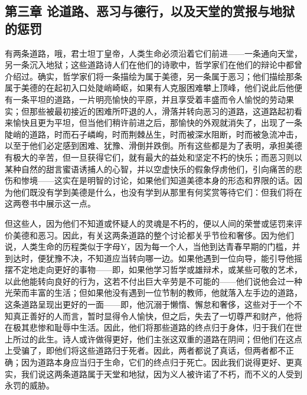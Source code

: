 
\subsection{第三章 论道路、恶习与德行，以及天堂的赏报与地狱的惩罚}

有两条道路，哦，君士坦丁皇帝，人类生命必须沿着它们前进——一条通向天堂，另一条沉入地狱；这些道路诗人们在他们的诗歌中，哲学家们在他们的辩论中都曾介绍过。确实，哲学家们将一条描绘为属于美德，另一条属于恶习；他们描绘那条属于美德的在起初入口处陡峭崎岖，如果有人克服困难攀上顶峰，他们说此后他便有一条平坦的道路，一片明亮愉快的平原，并且享受着丰盛而令人愉悦的劳动果实；但那些被最初接近的困难所吓退的人，滑落并转向恶习的道路，这道路起初看来愉快且更为平坦，但当他们稍许前进之后，那愉快的外观就消失了，出现了一条陡峭的道路，时而石子嶙峋，时而荆棘丛生，时而被深水阻断，时而被急流冲击，以至于他们必定感到困难、犹豫、滑倒并跌倒。所有这些都是为了表明，承担美德有极大的辛苦，但一旦获得它们，就有最大的益处和坚定不朽的快乐；而恶习则以某种自然的甜言蜜语诱捕人的心智，并以空虚快乐的假象俘虏他们，引向痛苦的悲伤和惨境——这实在是明智的讨论，如果他们知道美德本身的形态和界限的话。因为他们既没有学到美德是什么，也没有学到从那里有何奖赏等待它们：但我们将在这两卷书中展示这一点。\par

但这些人，因为他们不知道或怀疑人的灵魂是不朽的，便以人间的荣誉或惩罚来评价美德和恶习。因此，有关这两条道路的整个讨论都关乎节俭和奢侈。因为他们说，人类生命的历程类似于字母Y，因为每一个人，当他到达青春早期的门槛，并到达时，便犹豫不决，不知道应当转向哪一边。如果他遇到一位向导，能引导他摇摆不定地走向更好的事物——即，如果他学习哲学或雄辩术，或某些可敬的艺术，以此他能转向良好的行为，这若不付出巨大辛劳是不可能的——他们说他会过一种光荣而丰富的生活；但如果他没有遇到一位节制的教师，他就落入左手边的道路，这条道路呈现出更好的一面——即，他沉溺于懒惰、懈怠和奢侈，这些对于一个不知真正善好的人而言，暂时显得令人愉快，但之后，失去了一切尊严和财产，他将在极其悲惨和耻辱中生活。因此，他们将那些道路的终点归于身体，归于我们在世上所过的此生。诗人或许做得更好，他们主张这双重的道路在阴间；但他们在这点上受骗了，即他们将这些道路归于死者。因此，两者都说了真话，但两者都不正确；因为道路本身应当归于生命，它们的终点归于死亡。因此我们说得更好、更真实，我们说这两条道路属于天堂和地狱，因为义人被许诺了不朽，而不义的人受到永罚的威胁。\par

